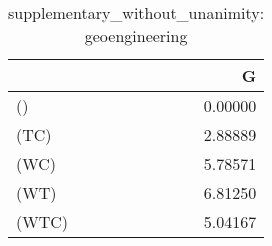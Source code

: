 \begin{table}
\centering
\caption{supplementary_without_unanimity: geoengineering}
\begin{tabular}{lr}
\toprule
{} &       G \\
\midrule
()    & 0.00000 \\
(TC)  & 2.88889 \\
(WC)  & 5.78571 \\
(WT)  & 6.81250 \\
(WTC) & 5.04167 \\
\bottomrule
\end{tabular}
\end{table}
